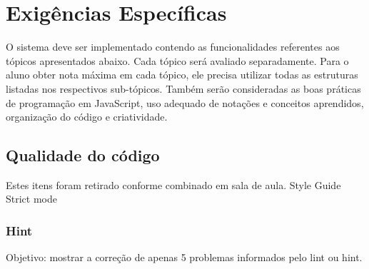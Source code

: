 \chapter{Exigências Específicas}
	O sistema deve ser implementado contendo as funcionalidades referentes aos tópicos apresentados abaixo. Cada tópico será avaliado separadamente. Para o aluno obter nota máxima em cada tópico, ele precisa utilizar todas as estruturas listadas nos respectivos sub-tópicos. Também serão consideradas as boas práticas de programação em JavaScript, uso adequado de notações e conceitos aprendidos, organização do código e criatividade.

\section{Qualidade do código}
Estes itens foram retirado conforme combinado em sala de aula.
Style Guide
Strict mode
\subsection{Hint}
	Objetivo: mostrar a correção de apenas 5 problemas informados pelo lint ou hint.
	

